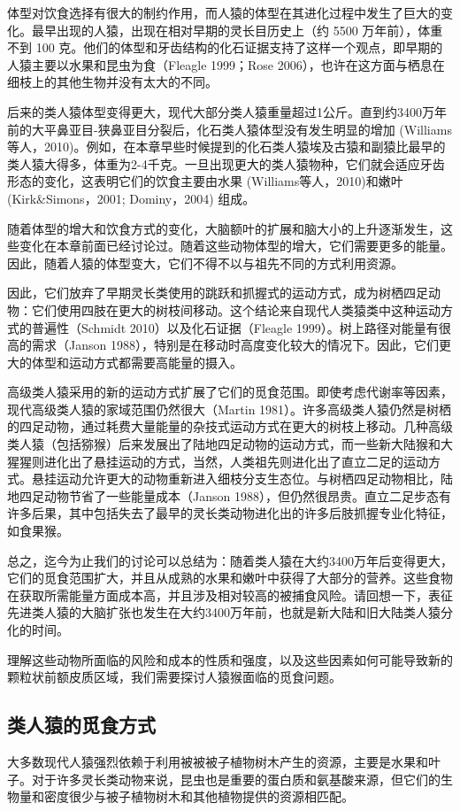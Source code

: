 体型对饮食选择有很大的制约作用，而人猿的体型在其进化过程中发生了巨大的变化。最早出现的人猿，出现在相对早期的灵长目历史上（约 5500 万年前），体重不到 100 克。他们的体型和牙齿结构的化石证据支持了这样一个观点，即早期的人猿主要以水果和昆虫为食（Fleagle 1999；Rose 2006），也许在这方面与栖息在细枝上的其他生物并没有太大的不同。

后来的类人猿体型变得更大，现代大部分类人猿重量超过1公斤。直到约3400万年前的大平鼻亚目-狭鼻亚目分裂后，化石类人猿体型没有发生明显的增加 (Williams等人，2010)。例如，在本章早些时候提到的化石类人猿埃及古猿和副猿比最早的类人猿大得多，体重为2-4千克。一旦出现更大的类人猿物种，它们就会适应牙齿形态的变化，这表明它们的饮食主要由水果 (Williams等人，2010)和嫩叶 (Kirk\&Simons，2001; Dominy，2004) 组成。

随着体型的增大和饮食方式的变化，大脑额叶的扩展和脑大小的上升逐渐发生，这些变化在本章前面已经讨论过。随着这些动物体型的增大，它们需要更多的能量。因此，随着人猿的体型变大，它们不得不以与祖先不同的方式利用资源。

因此，它们放弃了早期灵长类使用的跳跃和抓握式的运动方式，成为树栖四足动物：它们使用四肢在更大的树枝间移动。这个结论来自现代人类猿类中这种运动方式的普遍性（Schmidt 2010）以及化石证据（Fleagle 1999）。树上路径对能量有很高的需求（Janson 1988），特别是在移动时高度变化较大的情况下。因此，它们更大的体型和运动方式都需要高能量的摄入。

高级类人猿采用的新的运动方式扩展了它们的觅食范围。即使考虑代谢率等因素，现代高级类人猿的家域范围仍然很大（Martin 1981）。许多高级类人猿仍然是树栖的四足动物，通过耗费大量能量的杂技式运动方式在更大的树枝上移动。几种高级类人猿（包括猕猴）后来发展出了陆地四足动物的运动方式，而一些新大陆猴和大猩猩则进化出了悬挂运动的方式，当然，人类祖先则进化出了直立二足的运动方式。悬挂运动允许更大的动物重新进入细枝分支生态位。与树栖四足动物相比，陆地四足动物节省了一些能量成本（Janson 1988），但仍然很昂贵。直立二足步态有许多后果，其中包括失去了最早的灵长类动物进化出的许多后肢抓握专业化特征，如食果猴。

总之，迄今为止我们的讨论可以总结为：随着类人猿在大约3400万年后变得更大，它们的觅食范围扩大，并且从成熟的水果和嫩叶中获得了大部分的营养。这些食物在获取所需能量方面成本高，并且涉及相对较高的被捕食风险。请回想一下，表征先进类人猿的大脑扩张也发生在大约3400万年前，也就是新大陆和旧大陆类人猿分化的时间。

理解这些动物所面临的风险和成本的性质和强度，以及这些因素如何可能导致新的颗粒状前额皮质区域，我们需要探讨人猿猴面临的觅食问题。

\subsection{类人猿的觅食方式}
大多数现代人猿强烈依赖于利用被被被子植物树木产生的资源，主要是水果和叶子。对于许多灵长类动物来说，昆虫也是重要的蛋白质和氨基酸来源，但它们的生物量和密度很少与被子植物树木和其他植物提供的资源相匹配。


